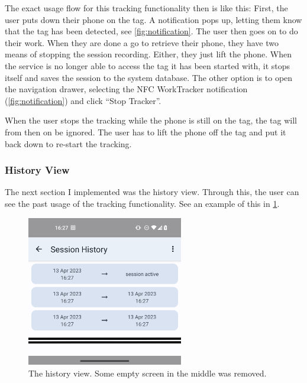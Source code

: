 \documentclass[conference]{IEEEtran}
\newcommand{\projectname}{NFC WorkTracker}
\newcommand{\phonescreenwidth}{2.69in}
\begin{document}
The exact usage flow for this tracking functionality then is like this: First, the user puts down their phone on the tag. A notification pops up, letting them know that the tag has been detected, see \cref{fig:notification}. The user then goes on to do their work. When they are done a go to retrieve their phone, they have two means of stopping the session recording. Either, they just lift the phone. When the service is no longer able to access the tag it has been started with, it stops itself and saves the session to the system database. The other option is to open the navigation drawer, selecting the \projectname{} notification (\cref{fig:notification}) and click ``Stop Tracker''.

When the user stops the tracking while the phone is still on the tag, the tag will from then on be ignored. The user has to lift the phone off the tag and put it back down to re-start the tracking.

\subsubsection{History View}
The next section I implemented was the history view. Through this, the user can see the past usage of the tracking functionality. See an example of this in \cref{fig:history}.

\begin{figure}
	\centering
	\includegraphics[width=\phonescreenwidth]{screenshots/history_smaller.png}
	\caption{The history view. Some empty screen in the middle was removed.}
	\label{fig:history}
\end{figure}
\end{document}
